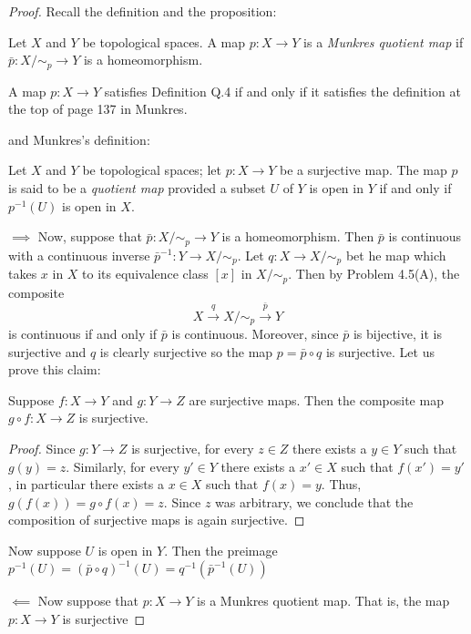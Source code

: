 \begin{proof}
Recall the definition and the proposition:
\begin{definition*}
Let $X$ and $Y$ be topological spaces. A map $p\colon X\to Y$ is
a \emph{Munkres quotient map} if $\bar p\colon X/{\sim_p}\to Y$
is a homeomorphism.
\end{definition*}
\begin{proposition*}[Proposition Q.5]
A map $p\colon X\to Y$ satisfies Definition Q.4 if and only if it
satisfies the definition at the top of page 137 in Munkres.
\end{proposition*}
and Munkres's definition:
\begin{definition*}[Munkres \S22, p.\,137]
Let $X$ and $Y$ be topological spaces; let $p\colon X\to Y$ be a
surjective map. The map $p$ is said to be a \emph{quotient map}
provided a subset $U$ of $Y$ is open in $Y$ if and only if
$p^{-1}(U)$ is open in $X$.
\end{definition*}
$\implies$ Now, suppose that $\bar p\colon X/{\sim_p}\to Y$ is a
homeomorphism. Then $\bar p$ is continuous with a continuous
inverse $\bar p^{-1}\colon Y\to X/{\sim_p}$. Let $q\colon X\to
X/{\sim_p}$ bet he map which takes $x$ in $X$ to its equivalence
class $[x]$ in $X/{\sim_p}$. Then by Problem 4.5(A), the composite
\[
X\overset{q}{\longrightarrow}X/{\sim_p}\overset{\bar p}{\longrightarrow}Y
\]
is continuous if and only if $\bar p$ is continuous. Moreover,
since $\bar p$ is bijective, it is surjective and $q$ is clearly
surjective so the map $p=\bar p\circ q$ is surjective. Let us
prove this claim:
\begin{lemma}
Suppose $f\colon X\to Y$ and $g\colon Y\to Z$ are surjective
maps. Then the composite map $g\circ f\colon X\to Z$ is surjective.
\end{lemma}
\begin{proof}
\renewcommand\qedsymbol{$\clubsuit$}
Since $g\colon Y\to Z$ is surjective, for every $z\in Z$ there
exists a $y\in Y$ such that $g(y)=z$. Similarly, for every $y'\in
Y$ there exists a $x'\in X$ such that $f(x')=y'$, in particular
there exists a $x\in X$ such that $f(x)=y$. Thus, $g(f(x))=g\circ
f(x)=z$. Since $z$ was arbitrary, we conclude that the
composition of surjective maps is again surjective.
\end{proof}
Now suppose $U$ is open in $Y$. Then the preimage
$p^{-1}(U)=(\bar p\circ q)^{-1}(U)=q^{-1}\left(\bar p^{-1}(U)\right)$

$\impliedby$ Now suppose that $p\colon X\to Y$ is a Munkres
quotient map. That is, the map $p\colon X\to Y$ is surjective
\end{proof}
